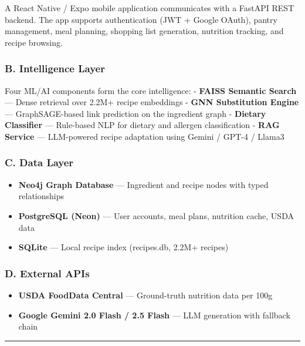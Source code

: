 \documentclass[
  10pt,
]{article}
\providecommand{\tightlist}{%
  \setlength{\itemsep}{0pt}\setlength{\parskip}{0pt}}
\begin{document}
A React Native / Expo mobile application communicates with a FastAPI
REST backend. The app supports authentication (JWT + Google OAuth),
pantry management, meal planning, shopping list generation, nutrition
tracking, and recipe browsing.

\subsubsection{B. Intelligence Layer}\label{b.-intelligence-layer}

Four ML/AI components form the core intelligence: - \textbf{FAISS
Semantic Search} --- Dense retrieval over 2.2M+ recipe embeddings -
\textbf{GNN Substitution Engine} --- GraphSAGE-based link prediction on
the ingredient graph - \textbf{Dietary Classifier} --- Rule-based NLP
for dietary and allergen classification - \textbf{RAG Service} ---
LLM-powered recipe adaptation using Gemini / GPT-4 / Llama3

\subsubsection{C. Data Layer}\label{c.-data-layer}

\begin{itemize}
\tightlist
\item
  \textbf{Neo4j Graph Database} --- Ingredient and recipe nodes with
  typed relationships
\item
  \textbf{PostgreSQL (Neon)} --- User accounts, meal plans, nutrition
  cache, USDA data
\item
  \textbf{SQLite} --- Local recipe index (recipes.db, 2.2M+ recipes)
\end{itemize}

\subsubsection{D. External APIs}\label{d.-external-apis}

\begin{itemize}
\tightlist
\item
  \textbf{USDA FoodData Central} --- Ground-truth nutrition data per
  100g
\item
  \textbf{Google Gemini 2.0 Flash / 2.5 Flash} --- LLM generation with
  fallback chain
\end{itemize}

\begin{center}\rule{0.5\linewidth}{0.5pt}\end{center}
\end{document}
